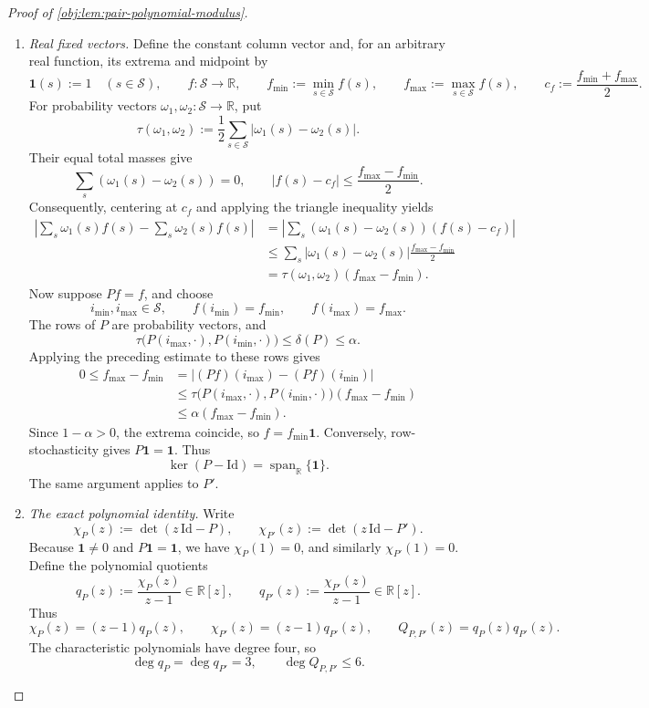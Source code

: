 \begin{proof}[Proof of \cref{obj:lem:pair-polynomial-modulus}]
\begin{enumerate}
\item \emph{Real fixed vectors.}\label{proof:pair-polynomial-modulus:fixed-vectors}
Define the constant column vector and, for an arbitrary real function, its extrema and midpoint by
\[
\mathbf1(s):=1\quad(s\in\mathcal S),\qquad
f:\mathcal S\to\mathbb R,\qquad
f_{\min}:=\min_{s\in\mathcal S}f(s),\qquad
f_{\max}:=\max_{s\in\mathcal S}f(s),\qquad
c_f:=\frac{f_{\min}+f_{\max}}2.
\]
For probability vectors \(\omega_1,\omega_2:\mathcal S\to\mathbb R\), put
\[
\tau(\omega_1,\omega_2)
:=\frac12\sum_{s\in\mathcal S}|\omega_1(s)-\omega_2(s)|.
\]
Their equal total masses give
\[
\sum_s(\omega_1(s)-\omega_2(s))=0,
\qquad
|f(s)-c_f|\le\frac{f_{\max}-f_{\min}}2.
\]
Consequently, centering at \(c_f\) and applying the triangle inequality yields
\[
\begin{aligned}
\left|\sum_s\omega_1(s)f(s)-\sum_s\omega_2(s)f(s)\right|
&=\left|\sum_s(\omega_1(s)-\omega_2(s))(f(s)-c_f)\right|\\
&\le\sum_s|\omega_1(s)-\omega_2(s)|
                 \frac{f_{\max}-f_{\min}}2\\
&=\tau(\omega_1,\omega_2)(f_{\max}-f_{\min}).
\end{aligned}
\]
Now suppose \(Pf=f\), and choose
\[
i_{\min},i_{\max}\in\mathcal S,\qquad
f(i_{\min})=f_{\min},\qquad f(i_{\max})=f_{\max}.
\]
The rows of \(P\) are probability vectors, and
\[
\tau\bigl(P(i_{\max},\cdot),P(i_{\min},\cdot)\bigr)
\le\delta(P)\le\alpha.
\]
Applying the preceding estimate to these rows gives
\[
\begin{aligned}
0\le f_{\max}-f_{\min}
&=\left|(Pf)(i_{\max})-(Pf)(i_{\min})\right|\\
&\le
\tau\bigl(P(i_{\max},\cdot),P(i_{\min},\cdot)\bigr)
       (f_{\max}-f_{\min})\\
&\le\alpha(f_{\max}-f_{\min}).
\end{aligned}
\]
Since \(1-\alpha>0\), the extrema coincide, so \(f=f_{\min}\mathbf1\).
Conversely, row-stochasticity gives \(P\mathbf1=\mathbf1\). Thus
\[
\ker(P-\mathrm{Id})=\operatorname{span}_{\mathbb R}\{\mathbf1\}.
\]
The same argument applies to \(P'\).

\item \emph{The exact polynomial identity.}\label{proof:pair-polynomial-modulus:identity}
Write
\[
\chi_P(z):=\det(z\,\mathrm{Id}-P),\qquad
\chi_{P'}(z):=\det(z\,\mathrm{Id}-P').
\]
Because \(\mathbf1\ne0\) and \(P\mathbf1=\mathbf1\), we have
\(\chi_P(1)=0\), and similarly \(\chi_{P'}(1)=0\).
Define the polynomial quotients
\[
q_P(z):=\frac{\chi_P(z)}{z-1}\in\mathbb R[z],
\qquad
q_{P'}(z):=\frac{\chi_{P'}(z)}{z-1}\in\mathbb R[z].
\]
Thus
\[
\chi_P(z)=(z-1)q_P(z),\qquad
\chi_{P'}(z)=(z-1)q_{P'}(z),\qquad
Q_{P,P'}(z)=q_P(z)q_{P'}(z).
\]
The characteristic polynomials have degree four, so
\[
\deg q_P=\deg q_{P'}=3,\qquad \deg Q_{P,P'}\le6.
\]


\end{enumerate}
\end{proof}
